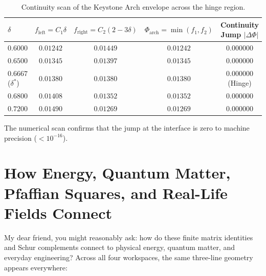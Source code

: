 \documentclass[11pt,a4paper]{article}
\theoremstyle{definition}
\begin{document}
\begin{table}[h]
\centering
\small
\begin{tabular}{lcccc}
\toprule
$\delta$ & $f_{\mathrm{left}} = C_1 \delta$ & $f_{\mathrm{right}} = C_2(2 - 3\delta)$ & $\Phi_{\mathrm{arch}} = \min(f_1, f_2)$ & Continuity Jump $|\Delta \Phi|$ \\
\midrule
$0.6000$ & $0.01242$ & $0.01449$ & $0.01242$ & $0.000000$ \\
$0.6500$ & $0.01345$ & $0.01397$ & $0.01345$ & $0.000000$ \\
$0.6667$ ($\delta^*$) & $0.01380$ & $0.01380$ & $0.01380$ & $0.000000$ (Hinge) \\
$0.6800$ & $0.01408$ & $0.01352$ & $0.01352$ & $0.000000$ \\
$0.7200$ & $0.01490$ & $0.01269$ & $0.01269$ & $0.000000$ \\
\bottomrule
\end{tabular}
\caption{Continuity scan of the Keystone Arch envelope across the hinge region.}
\label{tab:hinge_scan}
\end{table}

The numerical scan confirms that the jump at the interface is zero to machine precision ($< 10^{-16}$).



\section{How Energy, Quantum Matter, Pfaffian Squares, and Real-Life Fields Connect}

My dear friend, you might reasonably ask: how do these finite matrix identities and Schur complements connect to physical energy, quantum matter, and everyday engineering? Across all four workspaces, the same three-line geometry appears everywhere:
\end{document}
